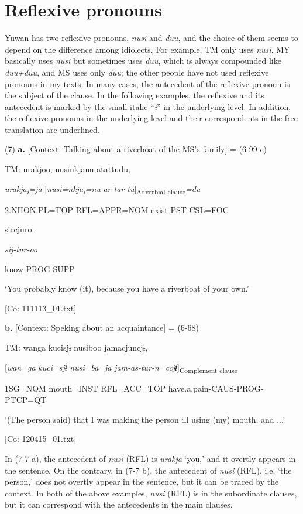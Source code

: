\section{Reflexive pronouns}

Yuwan has two reflexive pronouns, \textit{nusi} and \textit{duu}, and the choice of them seems to depend on the difference among idiolects. For example, TM only uses \textit{nusi}, MY basically uses \textit{nusi} but sometimes uses \textit{duu}, which is always compounded like \textit{duu+duu}, and MS uses only \textit{duu}; the other people have not used reflexive pronouns in my texts. In many cases, the antecedent of the reflexive pronoun is the subject of the clause. In the following examples, the reflexive and its antecedent is marked by the small italic “\textit{i}” in the underlying level. In addition, the reflexive pronouns in the underlying level and their correspondents in the free translation are underlined.

(7)  \textbf{a.}  [Context: Talking about a riverboat of the MS’s family] = (6-99 c)

    TM:  urakjoo,  nusinkjanu  atattudu,

      \textit{urakja\textsubscript{i}}\textit{=ja}  [\textit{nusi=nkja\textsubscript{i}}\textit{=nu}  \textit{ar-tar-tu}]\textsubscript{Adverbial clause}\textit{=du}

      2.NHON.PL=TOP  RFL=APPR=NOM  exist-PST-CSL=FOC

      siccjuro.

      \textit{sij-tur-oo}

      know-PROG-SUPP

      ‘You probably know (it), because you have a riverboat of your own.’

      [Co: 111113\_01.txt]

  \textbf{b.}  [Context: Speking about an acquaintance] = (6-68)

    TM:  wanga  kucisjɨ  nusiboo  jamacjuncjɨ,

      [\textit{wan=ga}  \textit{kuci=sjɨ}  \textit{nusi=ba=ja}  \textit{jam-as-tur-n=ccjɨ}]\textsubscript{Complement clause}

      1SG=NOM  mouth=INST  RFL=ACC=TOP  have.a.pain-CAUS-PROG-PTCP=QT

      ‘(The person said) that I was making the person\textit{\textsubscript{} }ill using (my) mouth, and ...’

      [Co: 120415\_01.txt]

In (7-7 a), the antecedent of \textit{nusi} (RFL) is \textit{urakja} ‘you,’ and it overtly appears in the sentence. On the contrary, in (7-7 b), the antecedent of \textit{nusi} (RFL), i.e. ‘the person,’ does not overtly appear in the sentence, but it can be traced by the context. In both of the above examples, \textit{nusi} (RFL) is in the subordinate clauses, but it can correspond with the antecedents in the main clauses.

